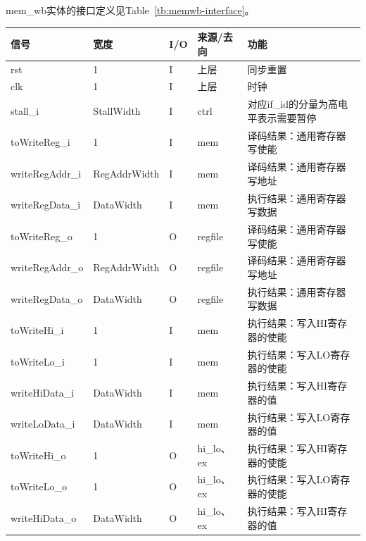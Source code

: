 \documentclass{article}
\begin{document}
\begin{spacing}{1.4}
mem\_wb实体的接口定义见Table~\ref{tb:memwb-interface}。
\begin{longtable}{l|l|l|l|p{5cm}}
\hline
\textbf{信号}&\textbf{宽度}&\textbf{I/O}&\textbf{来源/去向}&\textbf{功能} \\
\hline \endhead rst            & 1                      & I     & 上层          & 同步重置 \\
\hline clk                     & 1                      & I     & 上层          & 时钟 \\
\hline stall\_i                & StallWidth             & I     & ctrl          & 对应if\_id的分量为高电平表示需要暂停 \\
\hline toWriteReg\_i           & 1                      & I     & mem           & 译码结果：通用寄存器写使能 \\
\hline writeRegAddr\_i         & RegAddrWidth           & I     & mem           & 译码结果：通用寄存器写地址 \\
\hline writeRegData\_i         & DataWidth              & I     & mem           & 执行结果：通用寄存器写数据 \\
\hline toWriteReg\_o           & 1                      & O     & regfile       & 译码结果：通用寄存器写使能 \\
\hline writeRegAddr\_o         & RegAddrWidth           & O     & regfile       & 译码结果：通用寄存器写地址 \\
\hline writeRegData\_o         & DataWidth              & O     & regfile       & 执行结果：通用寄存器写数据 \\
\hline toWriteHi\_i            & 1                      & I     & mem           & 执行结果：写入HI寄存器的使能 \\
\hline toWriteLo\_i            & 1                      & I     & mem           & 执行结果：写入LO寄存器的使能 \\
\hline writeHiData\_i          & DataWidth              & I     & mem           & 执行结果：写入HI寄存器的值 \\
\hline writeLoData\_i          & DataWidth              & I     & mem           & 执行结果：写入LO寄存器的值 \\
\hline toWriteHi\_o            & 1                      & O     & hi\_lo、ex    & 执行结果：写入HI寄存器的使能 \\
\hline toWriteLo\_o            & 1                      & O     & hi\_lo、ex    & 执行结果：写入LO寄存器的使能 \\
\hline writeHiData\_o          & DataWidth              & O     & hi\_lo、ex    & 执行结果：写入HI寄存器的值 \\

\end{longtable}
\end{spacing}
\end{document}
